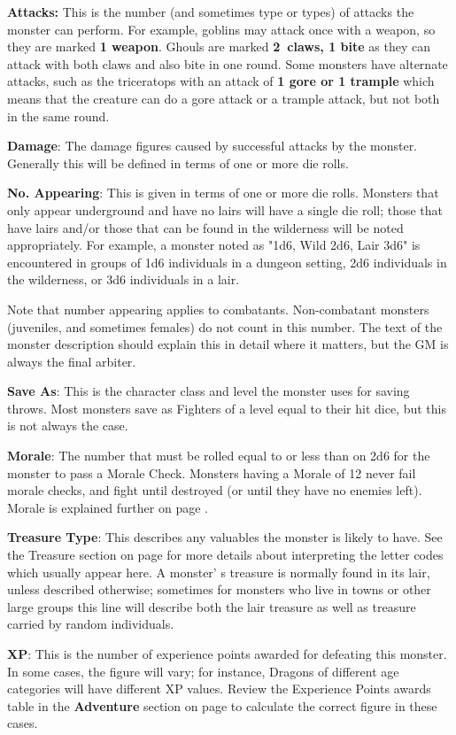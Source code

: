 \documentclass[a4paper,twoside,openany,10pt]{book}
\begin{document}
\begin{multicols}{2}
\textbf{Attacks:} This is the number (and sometimes type or types) of attacks the monster can perform. For example, goblins may attack once with a weapon, so they are marked \textbf{1 weapon}. Ghouls are marked \textbf{2~claws, 1 bite }as they can attack with both claws and also bite in one round. Some monsters have alternate attacks, such as the triceratops with an attack of \textbf{1 gore or 1 trample} which means that the creature can do a gore attack or a trample attack, but not both in the same round.

\textbf{Damage}: The damage figures caused by successful attacks by the monster. Generally this will be defined in terms of one or more die rolls.

\textbf{No. Appearing}: This is given in terms of one or more die rolls. Monsters that only appear underground and have no lairs will have a single die roll; those that have lairs and/or those that can be found in the wilderness will be noted appropriately. For example, a monster noted as "1d6, Wild 2d6, Lair 3d6" is encountered in groups of 1d6 individuals in a dungeon setting, 2d6 individuals in the wilderness, or 3d6 individuals in a lair.

Note that number appearing applies to combatants. Non-combatant monsters (juveniles, and sometimes females) do not count in this number. The text of the monster description should explain this in detail where it matters, but the GM is always the final arbiter.

\textbf{Save As}: This is the character class and level the monster uses for saving throws. Most monsters save as Fighters of a level equal to their hit dice, but this is not always the case.

\textbf{Morale}: The number that must be rolled equal to or less than on 2d6 for the monster to pass a Morale Check. Monsters having a Morale of 12 never fail morale checks, and fight until destroyed (or until they have no enemies left). Morale is explained further on page \hyperlink{morale}{\pageref{morale}}.

\textbf{Treasure Type}: This describes any valuables the monster is likely to have. See the Treasure section on page \hyperlink{part-7-treasure}{\pageref{part-7-treasure}} for more details about interpreting the letter codes which usually appear here. A monster' s treasure is normally found in its lair, unless described otherwise; sometimes for monsters who live in towns or other large groups this line will describe both the lair treasure as well as treasure carried by random individuals.

\textbf{XP}: This is the number of experience points awarded for defeating this monster. In some cases, the figure will vary; for instance, Dragons of different age categories will have different XP values. Review the Experience Points awards table in the \textbf{Adventure} section on page \hyperlink{experience-points-xp}{\pageref{experience-points-xp}} to calculate the correct figure in these cases.

\end{multicols}
\end{document}
